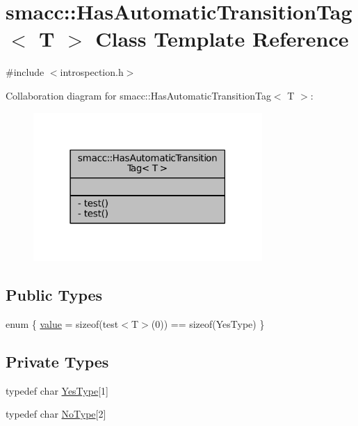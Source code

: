 \hypertarget{classsmacc_1_1HasAutomaticTransitionTag}{}\section{smacc\+:\+:Has\+Automatic\+Transition\+Tag$<$ T $>$ Class Template Reference}
\label{classsmacc_1_1HasAutomaticTransitionTag}


{\ttfamily \#include $<$introspection.\+h$>$}



Collaboration diagram for smacc\+:\+:Has\+Automatic\+Transition\+Tag$<$ T $>$\+:
\nopagebreak
\begin{figure}[H]
\begin{center}
\leavevmode
\includegraphics[width=247pt]{classsmacc_1_1HasAutomaticTransitionTag__coll__graph}
\end{center}
\end{figure}
\subsection*{Public Types}
\begin{DoxyCompactItemize}
\item 
enum \{ \hyperlink{classsmacc_1_1HasAutomaticTransitionTag_a129d2cfdc3c2071feb6eed2f328e77deac3cf7791b7f6bf4d5f4c7a93de7624a8}{value} = sizeof(test$<$T$>$(0)) == sizeof(Yes\+Type)
 \}
\end{DoxyCompactItemize}
\subsection*{Private Types}
\begin{DoxyCompactItemize}
\item 
typedef char \hyperlink{classsmacc_1_1HasAutomaticTransitionTag_ad3b0dca13c15ca18d97bbfa0f613614c}{Yes\+Type}\mbox{[}1\mbox{]}
\item 
typedef char \hyperlink{classsmacc_1_1HasAutomaticTransitionTag_adf9d68b94f123045a71e9a8ee31a5aa6}{No\+Type}\mbox{[}2\mbox{]}
\end{DoxyCompactItemize}
